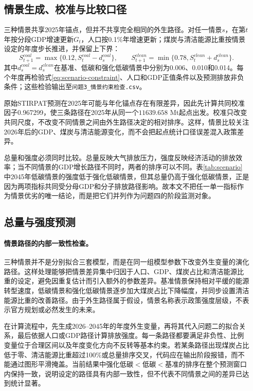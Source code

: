 \documentclass[12pt,a4paper]{ctexart}
\theoremstyle{definition}
\theoremstyle{plain}
\theoremstyle{remark}
\begin{document}
\subsection{情景生成、校准与比较口径}
三种情景共享2025年锚点，但并不共享完全相同的外生路径。对任一情景$s$，在第$t$年按分段GDP增速更新$G_t$，人口按0.1\%年增速更新；煤炭与清洁能源比重按情景设定的年度步长推进，并保留上下界：
\begin{equation}
S_{t+1}^{coal}=\max\{0.12,S_t^{coal}-d_s^{coal}\},\qquad
S_{t+1}^{clean}=\min\{0.78,S_t^{clean}+d_s^{clean}\}.
\label{eq:scenario-path}
\end{equation}
其中$d_s^{coal}=d_s^{clean}$在基准、低碳和强化低碳情景中分别为0.006、0.010和0.014。每个年度再检验式\eqref{eq:scenario-constraint}、人口和GDP正值条件以及预测排放非负条件；这些检验输出至\texttt{问题3\_情景约束检查.csv}。

原始STIRPAT预测在2025年可能与年化锚点存在有限差异，因此先计算共同校准因子0.967299，使三条路径在2025年从同一个$11639.658$ Mt起点出发。校准只改变共同尺度，不改变不同情景之间由外生路径决定的相对排序。这样，情景比较关注2026年后的GDP、煤炭与清洁能源变化，而不会把起点统计口径误差混入政策差异。

总量和强度必须同时比较。总量反映大气排放压力，强度反映经济活动的排放效率；当不同情景的GDP增长路径不同时，两者的排序可以不同。表\ref{tab:scenario}中2045年低碳情景的强度低于强化低碳情景，但其总量仍高于强化低碳情景，正是因为两项指标共同受分母GDP和分子排放路径影响。故本文不把任一单一指标作为情景优劣的唯一结论，而是把它们并列作为问题四的阶段监测对象。
\subsection{总量与强度预测}\paragraph{情景路径的内部一致性检查。}
三种情景并不是分别拟合三套模型，而是在同一组模型参数下改变外生变量的演化路径。这样处理能够把情景差异集中归因于人口、GDP、煤炭占比和清洁能源比重的设定，避免因重复估计而引入额外的参数差异。基准情景保持相对平缓的能源转型速度，低碳情景和强化低碳情景逐步加大煤炭占比下降幅度，并同步设置清洁能源比重的改善路径。由于外生路径属于假设，情景名称表示政策强度层级，不表示官方规划或必然发生的未来。

在计算流程中，先生成2026--2045年的年度外生变量，再将其代入问题二的拟合关系，最后依据人口或GDP路径计算排放强度。每一条路径都要满足非负性、比例变量位于合理区间以及年度变化方向不反转等基本约束。若某条路径出现煤炭占比低于零、清洁能源比重超过100\%或总量排序交叉，代码应在输出阶段报错，而不能通过图形平滑掩盖。当前结果中强化低碳$<$低碳$<$基准的排序在整个预测窗口内保持一致，说明设定的路径具有内部一致性，但不代表不同情景之间的差异已达到统计显著。
\end{document}
